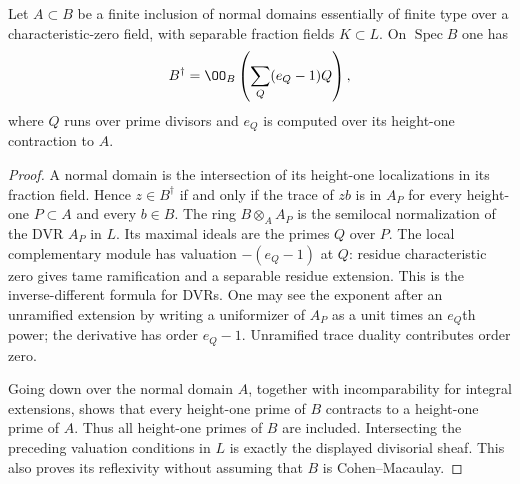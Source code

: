 \begin{lemma}
\label{lem:normal-complementary-v171}
Let $A\subset B$ be a finite inclusion of normal domains essentially of
finite type over a characteristic-zero field, with separable fraction
fields $K\subset L$. On $\operatorname{Spec}B$ one has
\[
 B^\dagger=\OO_B\left(\sum_Q(e_Q-1)Q\right),
\]
where $Q$ runs over prime divisors and $e_Q$ is computed over its
height-one contraction to $A$.
\end{lemma}
\begin{proof}
A normal domain is the intersection of its height-one localizations in
its fraction field. Hence $z\in B^\dagger$ if and only if the trace of
$zb$ is in $A_P$ for every height-one $P\subset A$ and every $b\in B$.
The ring $B\otimes_A A_P$ is the semilocal normalization of the DVR
$A_P$ in $L$. Its maximal ideals are the primes $Q$ over $P$.
The local complementary module has valuation $-(e_Q-1)$ at $Q$:
residue characteristic zero gives tame ramification and a separable
residue extension. This is the inverse-different formula for DVRs.
One may see the exponent after an unramified extension by writing a
uniformizer of $A_P$ as a unit times an $e_Q$th power; the derivative
has order $e_Q-1$. Unramified trace duality contributes order zero.

Going down over the normal domain $A$, together with incomparability
for integral extensions, shows that every height-one prime of $B$
contracts to a height-one prime of $A$. Thus all height-one primes
of $B$ are included. Intersecting the preceding valuation conditions in $L$
is exactly the displayed divisorial sheaf. This also proves its
reflexivity without assuming that $B$ is Cohen--Macaulay.
\end{proof}

